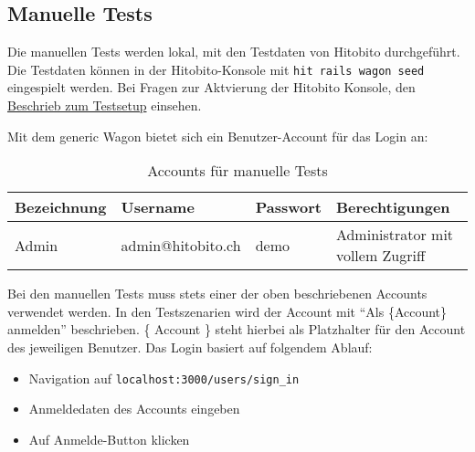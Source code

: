 \subsection{Manuelle Tests}
Die manuellen Tests werden lokal, mit den Testdaten von Hitobito durchgeführt. Die Testdaten können in der Hitobito-Konsole
mit \texttt{hit rails wagon seed} eingespielt werden. Bei Fragen zur Aktvierung der Hitobito Konsole, den \hyperref[testsetup]{\color{blue}Beschrieb zum Testsetup} einsehen.

\newpage

Mit dem generic Wagon bietet sich ein Benutzer-Account für das Login an:

\begin{table}[h!]
   \begin{tabular}{|L{0.2\textwidth}|L{0.3\textwidth}|L{0.2\textwidth}|L{0.4\textwidth}|}
       \hline
        \color{white}\textbf{Bezeichnung} & \color{white}\textbf{Username} & \color{white}\textbf{Passwort} & \color{white}\textbf{Berechtigungen}\\[12pt]
       \hline
        Admin & admin@hitobito.ch & demo & Administrator mit vollem Zugriff \\
       \hline
     \end{tabular}
     \caption{Accounts für manuelle Tests}
\end{table}

Bei den manuellen Tests muss stets einer der oben beschriebenen Accounts verwendet werden.
In den Testszenarien wird der Account mit ``Als \{Account\} anmelden'' beschrieben. \{ Account \} steht hierbei als
Platzhalter für den Account des jeweiligen Benutzer. 
Das Login basiert auf folgendem Ablauf:

\begin{itemize}
   \item Navigation auf \texttt{localhost:3000/users/sign\_in}
   \item Anmeldedaten des Accounts eingeben
   \item Auf Anmelde-Button klicken
\end{itemize}

\newpage

